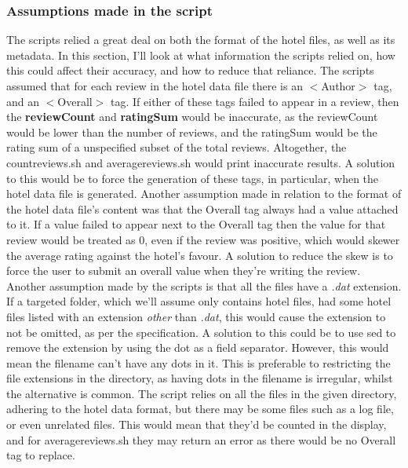 \documentclass{article}
\begin{document}
	\subsubsection{Assumptions made in the script} \label{Assumptions Issue}
	The scripts relied a great deal on both the format of the hotel files, as well as its metadata. In this section, I'll look at what information the scripts relied on, how this could affect their accuracy, and how to reduce that reliance.
	\newline \newline
	The scripts assumed that for each review in the hotel data file there is an $<$Author$>$ tag, and an $<$Overall$>$ tag. \newline
	If either of these tags failed to appear in a review, then the \textbf{reviewCount} and \textbf{ratingSum} would be inaccurate, as the reviewCount would be lower than the number of reviews, and the ratingSum would be the rating sum of a unspecified subset of the total reviews. Altogether, the countreviews.sh and averagereviews.sh would print inaccurate results. \newline
	A solution to this would be to force the generation of these tags, in particular, when the hotel data file is generated. 
	\newline \newline
	Another assumption made in relation to the format of the hotel data file's content was that the Overall tag always had a value attached to it. If a value failed to appear next to the Overall tag then the value for that review would be treated as 0, even if the review was positive, which would skewer the average rating against the hotel's favour.
	\newline
	A solution to reduce the skew is to force the user to submit an overall value when they're writing the review. 
	\newline \newline
	Another assumption made by the scripts is that all the files have a \textit{.dat} extension. \newline
	If a targeted folder, which we'll assume only contains hotel files, had some hotel files listed with an extension {\em other} than \textit{.dat}, this would cause the extension to not be omitted, as per the specification. 
	\newline
	A solution to this could be to use sed to remove the extension by using the dot as a field separator. However, this would mean the filename can't have any dots in it. This is preferable to restricting the file extensions in the directory, as having dots in the filename is irregular, whilst the alternative is common. 
	\newline \newline
	The script relies on all the files in the given directory, adhering to the hotel data format, but there may be some files such as a log file, or even unrelated files. This would mean that they'd be counted in the display, and for averagereviews.sh they may return an error as there would be no Overall tag to replace. \newline 
	\newline \newline
	
\end{document}
